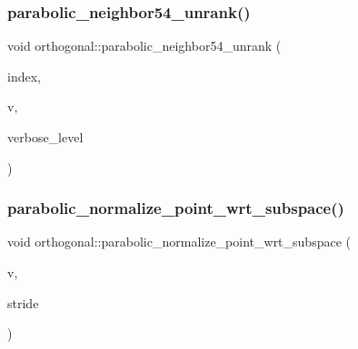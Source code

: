 \subsubsection{\texorpdfstring{parabolic\+\_\+neighbor54\+\_\+unrank()}{parabolic\_neighbor54\_unrank()}}
{\footnotesize\ttfamily void orthogonal\+::parabolic\+\_\+neighbor54\+\_\+unrank (\begin{DoxyParamCaption}\item[{\mbox{\hyperlink{galois_8h_a09fddde158a3a20bd2dcadb609de11dc}{I\+NT}}}]{index,  }\item[{\mbox{\hyperlink{galois_8h_a09fddde158a3a20bd2dcadb609de11dc}{I\+NT}} $\ast$}]{v,  }\item[{\mbox{\hyperlink{galois_8h_a09fddde158a3a20bd2dcadb609de11dc}{I\+NT}}}]{verbose\+\_\+level }\end{DoxyParamCaption})}

\mbox{\label{classorthogonal_addb6cb7424128361116573d43de60533}} 
\subsubsection{\texorpdfstring{parabolic\+\_\+normalize\+\_\+point\+\_\+wrt\+\_\+subspace()}{parabolic\_normalize\_point\_wrt\_subspace()}}
{\footnotesize\ttfamily void orthogonal\+::parabolic\+\_\+normalize\+\_\+point\+\_\+wrt\+\_\+subspace (\begin{DoxyParamCaption}\item[{\mbox{\hyperlink{galois_8h_a09fddde158a3a20bd2dcadb609de11dc}{I\+NT}} $\ast$}]{v,  }\item[{\mbox{\hyperlink{galois_8h_a09fddde158a3a20bd2dcadb609de11dc}{I\+NT}}}]{stride }\end{DoxyParamCaption})}

\mbox{\label{classorthogonal_a5a734a756f44e8ea0c2e4822e795e309}} 
